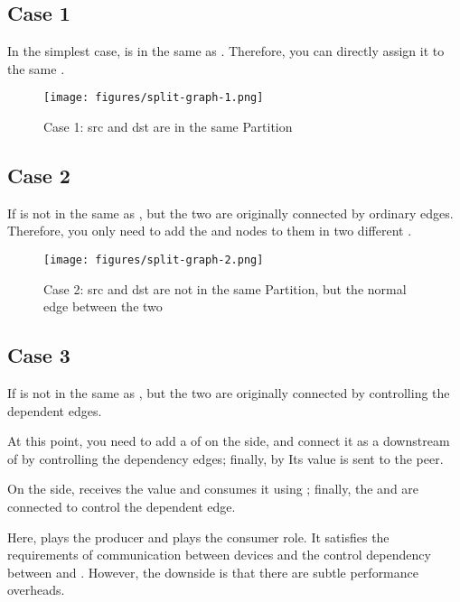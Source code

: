 \begin{content}
\subsection{Case 1}

In the simplest case,  is in the same  as . Therefore, you can directly assign it to the same .

\begin{figure}[H]
\centering
\texttt{[image: figures/split-graph-1.png]}
\caption{Case 1: src and dst are in the same Partition}
 \label{fig:split-graph-1}
\end{figure}

\subsection{Case 2}

If  is not in the same  as , but the two are originally connected by ordinary edges. Therefore, you only need to add the  and  nodes to them in two different .

\begin{figure}[H]
\centering
\texttt{[image: figures/split-graph-2.png]}
\caption{Case 2: src and dst are not in the same Partition, but the normal edge between the two}
 \label{fig:split-graph-2}
\end{figure}

\subsection{Case 3}

If  is not in the same  as , but the two are originally connected by controlling the dependent edges.

At this point, you need to add a  of  on the  side, and connect it as a downstream of  by controlling the dependency edges; finally, by  Its value is sent to the peer.

On the  side,  receives the value and consumes it using ; finally, the  and  are connected to control the dependent edge.

Here,  plays the producer and  plays the consumer role. It satisfies the requirements of communication between devices and the control dependency between  and . However, the downside is that there are subtle performance overheads.


\end{content}
